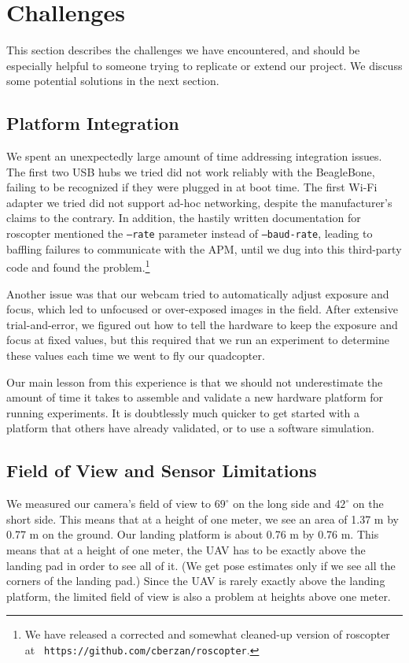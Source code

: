 \documentclass[10pt]{scrartcl} %
\begin{document}
\section{Challenges}

This section describes the challenges we have encountered, and should be
especially helpful to someone trying to replicate or extend our project. We
discuss some potential solutions in the next section.

\subsection{Platform Integration}

We spent an unexpectedly large amount of time addressing integration issues.
The first two USB hubs we tried did not work reliably with the BeagleBone,
failing to be recognized if they were plugged in at boot time. The first Wi-Fi
adapter we tried did not support ad-hoc networking, despite the manufacturer's
claims to the contrary. In addition, the hastily written documentation for
roscopter mentioned the {\tt --rate} parameter instead of {\tt --baud-rate},
leading to baffling failures to communicate with the APM, until we dug into
this third-party code and found the problem.\footnote{We have released a
corrected and somewhat cleaned-up version of roscopter at {\tt
https://github.com/cberzan/roscopter}.}

Another issue was that our webcam tried to automatically adjust exposure and
focus, which led to unfocused or over-exposed images in the field. After
extensive trial-and-error, we figured out how to tell the hardware to keep the
exposure and focus at fixed values, but this required that we run an experiment
to determine these values each time we went to fly our quadcopter.

Our main lesson from this experience is that we should not underestimate the
amount of time it takes to assemble and validate a new hardware platform for
running experiments. It is doubtlessly much quicker to get started with a
platform that others have already validated, or to use a software simulation.

\subsection{Field of View and Sensor Limitations}

We measured our camera's field of view to $69^\circ$ on the long side and
$42^\circ$ on the short side. This means that at a height of one meter, we see
an area of 1.37 m by 0.77 m on the ground. Our landing platform is about 0.76 m
by 0.76 m. This means that at a height of one meter, the UAV has to be exactly
above the landing pad in order to see all of it. (We get pose estimates only if
we see all the corners of the landing pad.) Since the UAV is rarely exactly
above the landing platform, the limited field of view is also a problem at
heights above one meter.
\end{document}
